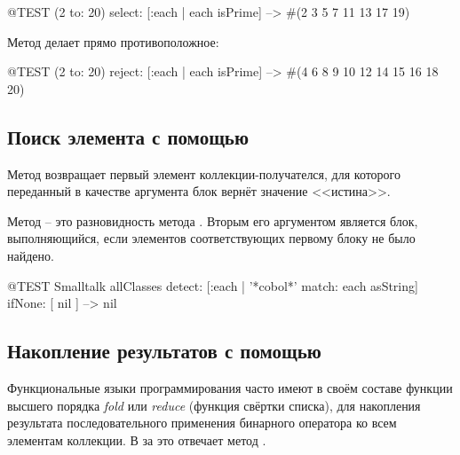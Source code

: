 \documentclass[a4paper,10pt,twoside]{book}
\begin{document}
\begin{code}{@TEST}
(2 to: 20) select: [:each | each isPrime] --> #(2 3 5 7 11 13 17 19)
\end{code}

Метод  делает прямо противоположное:
\begin{code}{@TEST}
(2 to: 20) reject: [:each | each isPrime] --> #(4 6 8 9 10 12 14 15 16 18 20)
\end{code}

\subsection{Поиск элемента с помощью }
Метод  возвращает первый элемент коллекции-получателся, для которого переданный в качестве аргумента блок вернёт значение <<истина>>.


Метод  -- это разновидность метода . Вторым его аргументом является блок, выполняющийся,
если элементов соответствующих первому блоку не было найдено.

\begin{code}{@TEST}
Smalltalk allClasses detect: [:each | '*cobol*' match: each asString] ifNone: [ nil ] --> nil
\end{code}

\subsection{Накопление результатов с помощью }
Функциональные языки программирования часто имеют в своём составе функции высшего порядка \emph{fold} или \emph{reduce} (функция свёртки списка), для накопления результата последовательного применения бинарного оператора ко всем элементам коллекции.
В \pharo за это отвечает метод .
\end{document}
